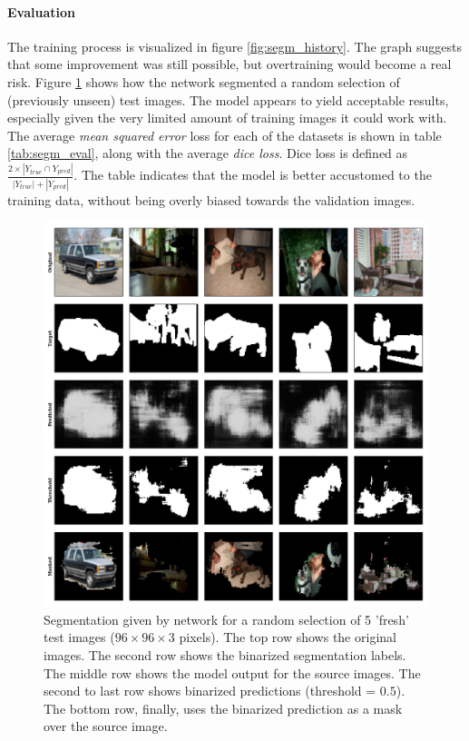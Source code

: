 \paragraph{Evaluation} The training process is visualized in figure \textcolor{blue}{\ref{fig:segm_history}}. The graph suggests that some improvement was still possible, but overtraining would become a real risk. Figure \textcolor{blue}{\ref{fig:segm_prediction}} shows how the network segmented a random selection of (previously unseen) test images. The model appears to yield acceptable results, especially given the very limited amount of training images it could work with. The average \textit{mean squared error} loss for each of the datasets is shown in table \textcolor{blue}{\ref{tab:segm_eval}}, along with the average \textit{dice loss}. Dice loss is defined as $ \frac{2\times| Y_{true} \cap Y_{pred}  |}{|  Y_{true}| +   |  Y_{pred}|}$. The table indicates that the model is better accustomed to the training data, without being overly biased towards the validation images.

\begin{figure}[!htbp]
  \begin{center}
    \includegraphics[width=\linewidth, keepaspectratio]{images/segm_prediction}
    \caption{Segmentation given by network for a random selection of 5 'fresh' test images ($96\times96\times3$ pixels). The top row shows the original images. The second row shows the binarized segmentation labels. The middle row shows the model output for the source images. The second to last row shows binarized predictions (threshold = $0.5$). The bottom row, finally, uses the binarized prediction as a mask over the source image.}
    \label{fig:segm_prediction}
  \end{center}
\end{figure}


